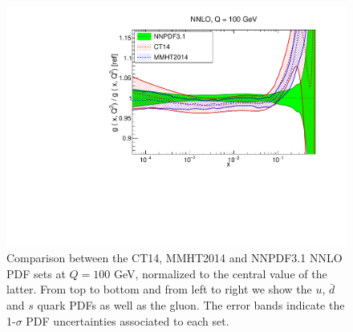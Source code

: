 \begin{figure}[t]
\begin{center}
   \includegraphics[scale=0.35]{plots/xg-31-nnlo-globalfits.pdf}
  \caption{\small Comparison between the CT14, MMHT2014
  and NNPDF3.1 NNLO PDF sets at $Q=100$ GeV, normalized
  to the central value of the latter.
  From top to bottom and from left to right we show the
  $u$, $\bar{d}$ and $s$ quark PDFs as well as the gluon.
  The error bands indicate the 1-$\sigma$ PDF uncertainties
  associated to each set.
    \label{fig:globalfits}
  }
\end{center}
\end{figure}
